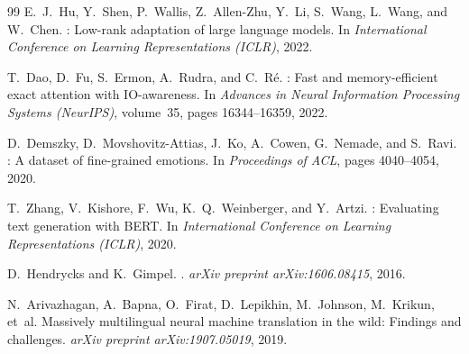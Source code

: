 \documentclass[11pt,a4paper]{article}
\begin{document}
\begin{thebibliography}{99}
E.~J.~Hu, Y.~Shen, P.~Wallis, Z.~Allen-Zhu, Y.~Li, S.~Wang, L.~Wang, and W.~Chen.
: Low-rank adaptation of large language models.
\newblock In \emph{International Conference on Learning Representations (ICLR)}, 2022.

T.~Dao, D.~Fu, S.~Ermon, A.~Rudra, and C.~R\'e.
: Fast and memory-efficient exact attention with {IO}-awareness.
\newblock In \emph{Advances in Neural Information Processing Systems (NeurIPS)}, volume~35, pages 16344--16359, 2022.

D.~Demszky, D.~Movshovitz-Attias, J.~Ko, A.~Cowen, G.~Nemade, and S.~Ravi.
: A dataset of fine-grained emotions.
\newblock In \emph{Proceedings of ACL}, pages 4040--4054, 2020.

T.~Zhang, V.~Kishore, F.~Wu, K.~Q.~Weinberger, and Y.~Artzi.
: Evaluating text generation with {BERT}.
\newblock In \emph{International Conference on Learning Representations (ICLR)}, 2020.

D.~Hendrycks and K.~Gimpel.
.
\newblock \emph{arXiv preprint arXiv:1606.08415}, 2016.

N.~Arivazhagan, A.~Bapna, O.~Firat, D.~Lepikhin, M.~Johnson, M.~Krikun, et~al.
\newblock Massively multilingual neural machine translation in the wild: Findings and challenges.
\newblock \emph{arXiv preprint arXiv:1907.05019}, 2019.

\end{thebibliography}
\end{document}
